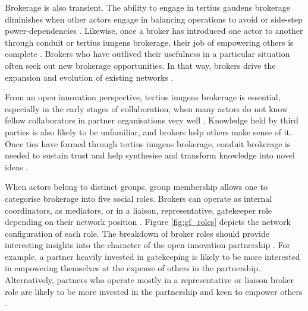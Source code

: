 Brokerage is also transient. The ability to engage in tertius gaudens brokerage diminishes when other actors engage in balancing operations to avoid or side-step power-dependencies \citep{emerson1962power}. Likewise, once a broker has introduced one actor to another through conduit or tertius iungens brokerage, their job of empowering others is complete \citep{obstfeld2014brokerage}. Brokers who have outlived their usefulness in a particular situation often seek out new brokerage opportunities. In that way, brokers drive the expansion and evolution of existing networks \citep{obstfeld2014brokerage,quintane2016brokers}. \medskip

From an open innovation perspective, tertius iungens brokerage is essential, especially in the early stages of collaboration, when many actors do not know fellow collaborators in partner organisations very well \citep{fleming2007collaborative}. Knowledge held by third parties is also likely to be unfamiliar, and brokers help others make sense of it. Once ties have formed through tertius iungens brokerage, conduit brokerage is needed to sustain trust and help synthesise and transform knowledge into novel ideas \citep{quintane2016brokers}. \medskip 

When actors belong to distinct groups, group membership allows one to categorise brokerage into five social roles. Brokers can operate as internal coordinators, as mediators, or in a liaison, representative, gatekeeper role depending on their network position \citep{gould1989structures}. Figure \ref{fig:gf_roles} depicts the network configuration of each role. The breakdown of broker roles should provide interesting insights into the character of the open innovation partnership \citep{spiro2013extended}. For example, a partner heavily invested in gatekeeping is likely to be more interested in empowering themselves at the expense of others in the partnership. Alternatively, partners who operate mostly in a representative or liaison broker role are likely to be more invested in the partnership and keen to empower others \citep{spiro2013extended}. \medskip

